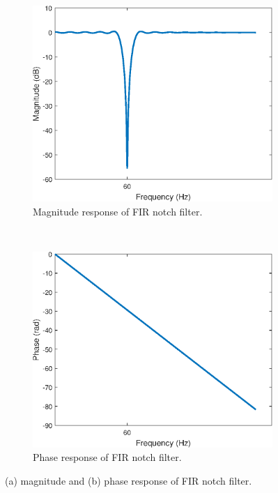 \documentclass{article}
\begin{document}
\FloatBarrier
\begin{figure}[h!]
	\centering
	\begin{subfigure}[h!]{0.5\textwidth}
		\includegraphics[width=\textwidth]{figs/ecg_fir_notch.eps}
		\caption{Magnitude response of FIR notch filter.} \label{fig:egc:fir_notch}
	\end{subfigure}%
	~ %
	\begin{subfigure}[h!]{0.5\textwidth}
		\includegraphics[width=\textwidth]{figs/ecg_fir_notch_phase.eps}
		\caption{Phase response of FIR notch filter.} \label{fig:egc:fir_notch_phase}
	\end{subfigure}
	\caption{(a) magnitude and (b) phase response of FIR notch filter.}
\end{figure}
\FloatBarrier
\end{document}
